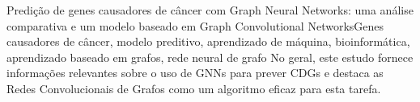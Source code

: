 \documentclass[ppgc, diss, english]{iiufrgs}
\begin{document}
\begin{englishabstract}{Predição de genes causadores de câncer com Graph Neural Networks: uma análise comparativa e um modelo baseado em Graph Convolutional Networks}{Genes causadores de câncer, modelo preditivo, aprendizado de máquina, bioinformática, aprendizado baseado em grafos, rede neural de grafo}
No geral, este estudo fornece informações relevantes sobre o uso de GNNs para prever CDGs e destaca as Redes Convolucionais de Grafos como um algoritmo eficaz para esta tarefa.
\end{englishabstract}
\end{document}
